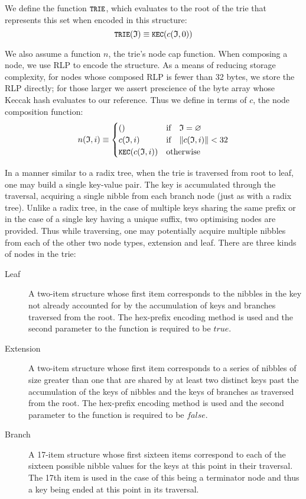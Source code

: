 \documentclass[9pt,oneside]{amsart}
\begin{document}
We define the function $\texttt{\small TRIE}$, which evaluates to the root of the trie that represents this set when encoded in this structure:
\begin{equation}
\texttt{\small TRIE}(\mathfrak{I}) \equiv \texttt{\small KEC}(c(\mathfrak{I}, 0))
\end{equation}

We also assume a function $n$, the trie's node cap function. When composing a node, we use RLP to encode the structure. As a means of reducing storage complexity, for nodes whose composed RLP is fewer than 32 bytes, we store the RLP directly; for those larger we assert prescience of the byte array whose Keccak hash evaluates to our reference. Thus we define in terms of $c$, the node composition function:
\begin{equation}
n(\mathfrak{I}, i) \equiv \begin{cases}
() & \text{if} \quad \mathfrak{I} = \varnothing \\
c(\mathfrak{I}, i) & \text{if} \quad \lVert c(\mathfrak{I}, i)\rVert < 32 \\
\texttt{\small KEC}(c(\mathfrak{I}, i)) & \text{otherwise}
\end{cases}
\end{equation}

In a manner similar to a radix tree, when the trie is traversed from root to leaf, one may build a single key-value pair. The key is accumulated through the traversal, acquiring a single nibble from each branch node (just as with a radix tree). Unlike a radix tree, in the case of multiple keys sharing the same prefix or in the case of a single key having a unique suffix, two optimising nodes are provided. Thus while traversing, one may potentially acquire multiple nibbles from each of the other two node types, extension and leaf. There are three kinds of nodes in the trie:
\begin{description}
\item[Leaf] A two-item structure whose first item corresponds to the nibbles in the key not already accounted for by the accumulation of keys and branches traversed from the root. The hex-prefix encoding method is used and the second parameter to the function is required to be $true$.
\item[Extension] A two-item structure whose first item corresponds to a series of nibbles of size greater than one that are shared by at least two distinct keys past the accumulation of the keys of nibbles and the keys of branches as traversed from the root. The hex-prefix encoding method is used and the second parameter to the function is required to be $false$.
\item[Branch] A 17-item structure whose first sixteen items correspond to each of the sixteen possible nibble values for the keys at this point in their traversal. The 17th item is used in the case of this being a terminator node and thus a key being ended at this point in its traversal.
\end{description}
\end{document}
